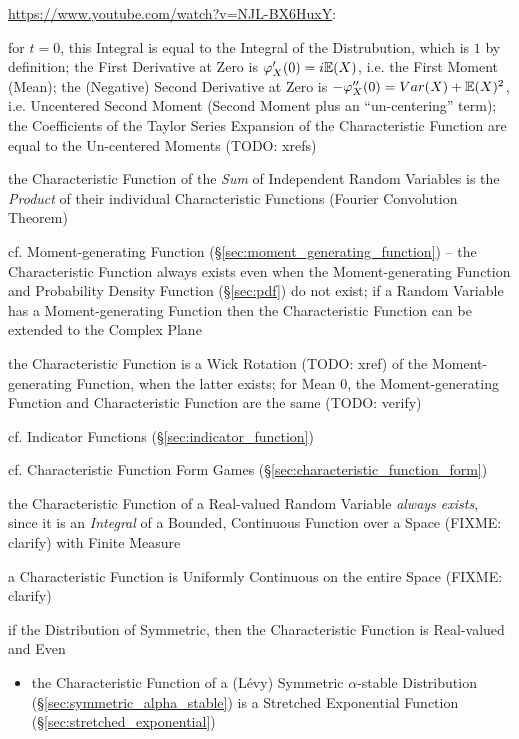 \url{https://www.youtube.com/watch?v=NJL-BX6HuxY}:

for $t = 0$, this Integral is equal to the Integral of the Distrubution, which
is $1$ by definition; the First Derivative at Zero is
$\varphi'_X(0) = i \mathbb{E}(X)$, i.e. the First Moment (Mean); the (Negative)
Second Derivative at Zero is $-\varphi''_X(0) = Var(X) + \mathbb{E}(X)^2$, i.e.
Uncentered Second Moment (Second Moment plus an ``un-centering'' term); the
Coefficients of the Taylor Series Expansion of the Characteristic Function are
equal to the Un-centered Moments (TODO: xrefs)

the Characteristic Function of the \emph{Sum} of Independent Random Variables is
the \emph{Product} of their individual Characteristic Functions (Fourier
Convolution Theorem)

cf. Moment-generating Function (\S\ref{sec:moment_generating_function}) --
the Characteristic Function always exists even when the Moment-generating
Function and Probability Density Function (\S\ref{sec:pdf}) do not exist;
if a Random Variable has a Moment-generating Function then the Characteristic
Function can be extended to the Complex Plane

the Characteristic Function is a Wick Rotation (TODO: xref) of the
Moment-generating Function, when the latter exists; for Mean $0$, the
Moment-generating Function and Characteristic Function are the same (TODO:
verify)

\fist cf. Indicator Functions (\S\ref{sec:indicator_function})

cf. Characteristic Function Form Games
(\S\ref{sec:characteristic_function_form})

the Characteristic Function of a Real-valued Random Variable \emph{always
exists}, since it is an \emph{Integral} of a Bounded, Continuous Function over a
Space (FIXME: clarify) with Finite Measure

a Characteristic Function is Uniformly Continuous on the entire Space (FIXME:
clarify)

if the Distribution of Symmetric, then the Characteristic Function is
Real-valued and Even

\begin{itemize}
  \item the Characteristic Function of a (L\'evy) Symmetric $\alpha$-stable
    Distribution (\S\ref{sec:symmetric_alpha_stable}) is a Stretched Exponential
    Function (\S\ref{sec:stretched_exponential})
\end{itemize}



